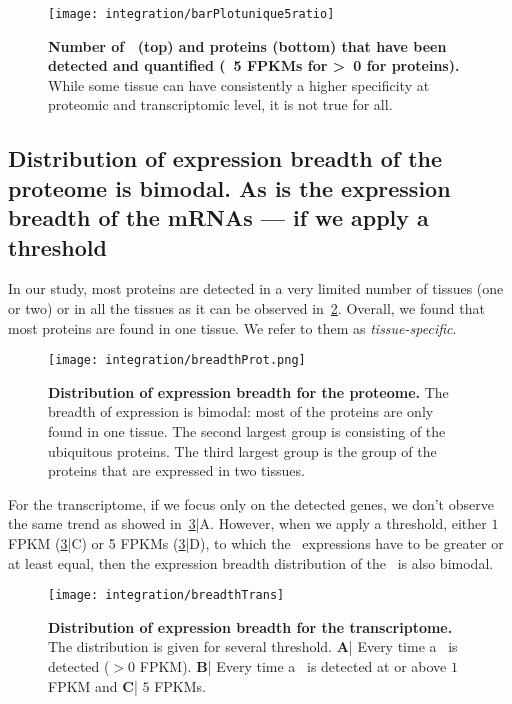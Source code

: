 \begin{figure}[!htbp]
    \texttt{[image: integration/barPlotunique5ratio]}\centering
     \caption[Distribution of \mRNAs\ and proteins detected (at specific
     thresholds) only in one unique
     tissue]{\label{fig:barPlotunique5ratio}\textbf{Number of
     \mRNAs\ (top) and proteins (bottom)
     that have been detected and quantified (\geq\ 5 \glspl{FPKM} for \mRNA\;
     \textgreater\ 0 for proteins).} While some tissue can have
     consistently a higher
     specificity at proteomic and transcriptomic level, it is not true for all.}
\end{figure}


\subsection{Distribution of expression breadth of the proteome is bimodal. As is
the expression breadth of the mRNAs --- if we apply a threshold}
\label{subsec:IntegrationProteinBimodalExpre}

In our study, most proteins are detected in a very limited number of tissues (one
or two) or in all the tissues as it can be observed in~\cref{fig:breadthProt}.
Overall, we found that most proteins are found in one tissue. We refer to them as
\emph{tissue-specific}.

\begin{figure}[!htbp]
    \texttt{[image: integration/breadthProt.png]}\centering
    \caption[Distribution of expression breadth for the proteome]
    {\label{fig:breadthProt}\textbf{Distribution of expression breadth for the
    proteome.} The breadth of expression is bimodal: most of the proteins are
    only found in one tissue. The second largest group is consisting of
    the ubiquitous proteins. The third largest group is the group of the proteins
    that are expressed in two tissues.}
\end{figure}


For the transcriptome, if we focus only on the detected genes, we don’t observe
the same trend as showed in~\cref{fig:breadthTrans}|A.
However, when we apply a threshold, either $1$ \gls{FPKM}
(\cref{fig:breadthTrans}|C) or
5 \glspl{FPKM} (\cref{fig:breadthTrans}|D), to which the \mRNA\ expressions
have to be greater or at least equal, then the expression breadth distribution
of the \mRNAs\ is also bimodal.

\begin{figure}[!htbp]
    \texttt{[image: integration/breadthTrans]}\centering
    \caption[Distribution of expression breadth for the transcriptome]
    {\label{fig:breadthTrans}\textbf{Distribution of expression breadth for the
    transcriptome.} The distribution is given for several threshold.
    \textbf{A}| Every time a \mRNA\ is detected ($> 0$ \gls{FPKM}).
    \textbf{B}| Every time a \mRNA\ is detected at or above $1$ \gls{FPKM} and
    \textbf{C}| $5$ \glspl{FPKM}.}
\end{figure}

